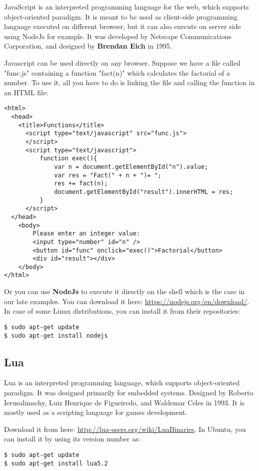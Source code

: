 \documentclass{KodeBook}
\begin{document}
JavaScript is an interpreted programming language for the web, which supports object-oriented paradigm. 
It is meant to be used as client-side programming language executed on different browser, but it can also execute on server side using NodeJs for example.
It was developed by Netscape Communications Corporation, and designed by \textbf{Brendan Eich} in 1995. 

Javascript can be used directly on any browser. 
Suppose we have a file called "func.js" containing a function "fact(n)" which calculates the factorial of a number. 
To use it, all you have to do is linking the file and calling the function in an HTML file:
\begin{lstlisting}[style=codeStyle]
<html>
  <head>
    <title>Functions</title>
      <script type="text/javascript" src="func.js">
      </script>
      <script type="text/javascript">
          function exec(){
              var n = document.getElementById("n").value;
              var res = "Fact(" + n + ")= ";
              res += fact(n);
              document.getElementById("result").innerHTML = res;
          }
      </script>
  </head>
    <body>
        Please enter an integer value: 
        <input type="number" id="n" />
        <button id="func" onclick="exec()">Factorial</button>
        <div id="result"></div>
    </body>
</html>
\end{lstlisting}


Or you can use \textbf{NodeJs} to execute it directly on the shell which is the case in our late examples. 
You can download it here: \url{https://nodejs.org/en/download/}. 
In case of some Linux distributions, you can install it from their repositories:
\begin{lstlisting}[style=shellStyle]
$ sudo apt-get update
$ sudo apt-get install nodejs
\end{lstlisting}

\subsection{Lua}

Lua is an interpreted programming language, which supports object-oriented paradigm. 
It was designed primarily for embedded systems.
Designed by Roberto Ierusalimschy, Luiz Henrique de Figueiredo, and Waldemar Celes in 1993.
It is mostly used as a scripting language for games development.

Download it from here: \url{http://lua-users.org/wiki/LuaBinaries}. 
In Ubuntu, you can install it by using its version number as:
\begin{lstlisting}[style=shellStyle]
$ sudo apt-get update
$ sudo apt-get install lua5.2
\end{lstlisting}
\end{document}
